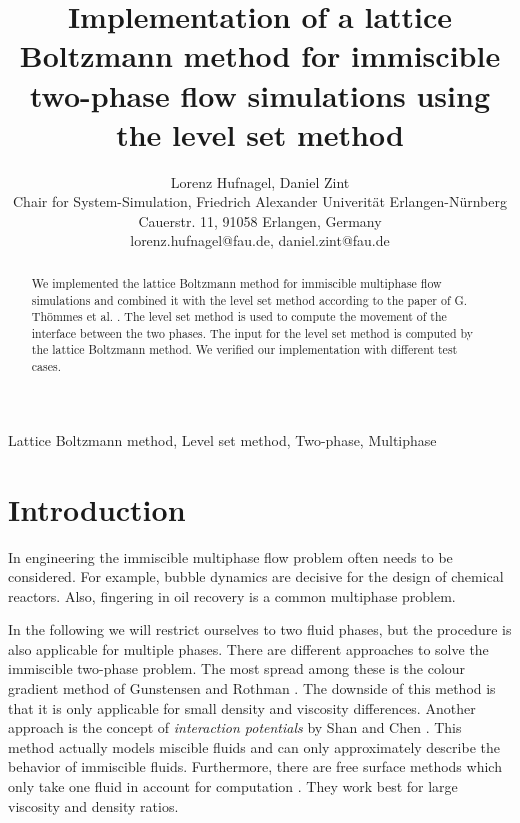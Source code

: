 \documentclass[final,leqno,onefignum,onetabnum]{siamltexmm}
\title{Implementation of a lattice Boltzmann method for immiscible two-phase flow simulations using the level set method}
\author
{Lorenz Hufnagel, Daniel Zint\\
Chair for System-Simulation, Friedrich Alexander Univerit\"at Erlangen-N\"urnberg\\
Cauerstr. 11, 91058 Erlangen, Germany\\
lorenz.hufnagel@fau.de, daniel.zint@fau.de %
}
\begin{document}
\maketitle
\newcommand{\slugmaster}{%
\slugger{}{}{}{}{}}%

\begin{abstract}
	We implemented the lattice Boltzmann method for immiscible multiphase flow simulations and combined it with the level set method according to the paper of G. Th\"ommes et al. \cite{Thoemmes}. The level set method is used to compute the movement of the interface between the two phases. The input for the level set method is computed by the lattice Boltzmann method. We verified our implementation with different test cases.
\end{abstract}

\begin{keywords}
	Lattice Boltzmann method,
	Level set method,
	Two-phase,
	Multiphase
\end{keywords}



\pagestyle{myheadings}
\thispagestyle{plain}

\section{Introduction}
In engineering the immiscible multiphase flow problem often needs to be considered. For example, bubble dynamics are decisive for the design of chemical reactors. Also, fingering in oil recovery is a common multiphase problem.

In the following we will restrict ourselves to two fluid phases, but the procedure is also applicable for multiple phases. 
There are different approaches to solve the immiscible two-phase problem. The most spread among these is the colour gradient method of Gunstensen and Rothman \cite{GRcg1,GRcg2,GRcg3}. The downside of this method is that it is only applicable for small density and viscosity differences. Another approach is the concept of {\it interaction potentials} by Shan and Chen \cite{ShanChen1,ShanChen2}. This method actually models miscible fluids and can only approximately describe the behavior of immiscible fluids. Furthermore, there are free surface methods which only take one fluid in account for computation \cite{Koerner,Scardovelli,Hirt}. They work best for large viscosity and density ratios.
\end{document}
